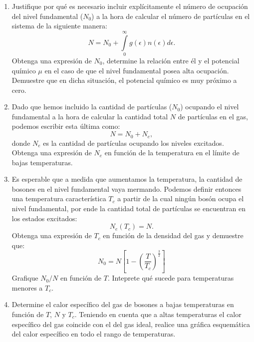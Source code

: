 \documentclass[a4paper,11pt]{article}
\begin{document}
\begin{enumerate}[label=(\alph*),
                  leftmargin=2\parindent,
                  rightmargin=2\parindent]

     \item{Justifique por qué es necesario incluir explícitamente el número
           de ocupación del nivel fundamental ($N_0$) a la hora de calcular el
           número de partículas en el sistema de la siguiente manera:
           $$
           N =
           N_0 + \int\limits_0^\infty g(\epsilon) n(\epsilon)
           d\epsilon.
           $$
           Obtenga una expresión de $N_0$, determine la relación entre él y el
           potencial químico $\mu$ en el caso de que el nivel fundamental
           posea alta ocupación.
           Demuestre que en dicha situación, el potencial químico es muy
           próximo a cero.
           }

     \item{Dado que hemos incluido la cantidad de partículas ($N_0$) ocupando
           el nivel fundamental a la hora de calcular la cantidad total $N$ de
           partículas en el gas, podemos escribir esta última como:
           $$ N = N_0 + N_e, $$
           donde $N_e$ es la cantidad de partículas ocupando los niveles
           excitados.
           Obtenga una expresión de $N_e$ en función de la temperatura en el
           límite de bajas temperaturas.}

     \item{Es esperable que a medida que aumentamos la temperatura, la
           cantidad de bosones en el nivel fundamental vaya mermando.
           Podemos definir entonces una temperatura característica $T_c$ a
           partir de la cual ningún bosón ocupa el nivel fundamental, por
           ende la cantidad total de partículas se encuentran en los estados
           excitados:
           $$ N_e(T_c) = N. $$
           Obtenga una expresión de $T_c$ en función de la densidad del gas
           y demuestre que:
           $$
           N_0 =
           N \left[ 1 - \left( \frac{T}{T_c} \right)^\frac{3}{2} \right]
           $$
           Grafique $N_0/N$ en función de $T$.
           Inteprete qué sucede para temperaturas menores a $T_c$.
           }

     \item{Determine el calor específico del gas de bosones a bajas
           temperaturas en función de $T$, $N$ y $T_c$.
           Teniendo en cuenta que a altas temperaturas el calor específico
           del gas coincide con el del gas ideal, realice una gráfica
           esquemática del calor específico en todo el rango de temperaturas.
           }

\end{enumerate}
\end{document}
